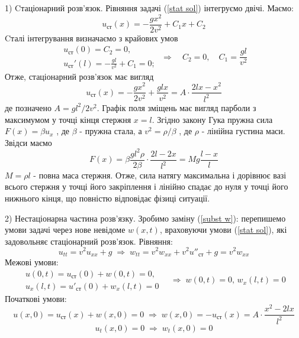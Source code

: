 1) Cтаціонарний розв'язок. 
Рівняння задачі (\ref{stat sol}) інтегруємо двічі. Маємо:
\begin{equation}
    u_{\text{ст}}(x) = - \frac{g x^2}{2v^2} + C_1 x + C_2
\end{equation}
Cталі інтегрування визначаємо з крайових умов 
\begin{equation}
    \begin{aligned}
        u_{\text{ст}}(0) = C_2 = 0,\\
        u_{\text{ст}}'(l) = -\frac{gl}{v^2} + C_1 = 0;
    \end{aligned}
    \;\Rightarrow\quad
    C_2 = 0, \quad C_1 = \frac{gl}{v^2}
\end{equation}
Отже, стаціонарний розв'язок має вигляд
\begin{equation}
    u_{\text{ст}}(x) = - \frac{g x^2}{2v^2} + \frac{glx}{v^2} = A \cdot \frac{2lx - x^2}{l^2}
\end{equation}
де позначено $A = g l^2/2v^2$.  Графік поля зміщень має вигляд парболи з максимумом у точці кінця стержня $x = l$. Згідно закону Гука пружна сила $F(x) = \beta u_x$ , де $\beta$  - пружна стала, а $v^2 = \rho/\beta$ , де $\rho$ - лінійна густина маси. Звідси маємо 
\begin{equation}
    F(x) = \beta \frac{g l^2 \rho}{2 \beta} \cdot \frac{2l - 2 x}{l^2} = M g \frac{l - x}{l}
\end{equation}
 $M = \rho l$ - повна маса стержня. Отже, сила натягу максимальна і дорівнює вазі всього стержня у точці його закріплення і лінійно спадає до нуля у точці його нижнього кінця, що повністю відповідає фізиці ситуації. 
 
 
 2) Нестаціонарна частина розв'язку.
 Зробимо заміну (\ref{subst w}): перепишемо умови задачі через  нове невідоме $w(x,t)$, враховуючи умови (\ref{stat sol}), які задовольняє стаціонарний розв'язок.
Рівняння:
\begin{equation*}
    u_{tt} = v^2 u_{xx} + g
    \;\Rightarrow\;
    w_{tt} = v^2w_{xx} + v^2 u''_{\text{ст}} + g = v^2w_{xx}
\end{equation*}
Межові умови:
\begin{equation*}
    \begin{aligned}
        u(0,t) = u_{\text{ст}} (0) + w(0,t) = 0,\\
        u_x(l,t) = u'_{\text{ст}} (0) + w_x(l,t) = 0
    \end{aligned}
        \quad\Rightarrow\; 
        w(0,t) = 0,\, w_x(l,t) = 0
\end{equation*}
Початкові умови:
\begin{equation*}
    u(x,0) = u_{\text{ст}} (x) + w(x,0) = 0
    \;\Rightarrow\;
    w(x,0) = - u_{\text{ст}} (x) = A \cdot \frac{x^2 - 2lx}{l^2}
\end{equation*}
\begin{equation*}
    u_t(x,0) = 0
    \;\Rightarrow\;
    w_t(x,0) = 0
\end{equation*}

